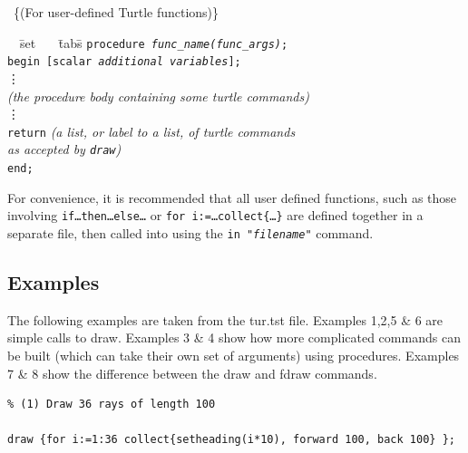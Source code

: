 \turtlesyntax\ \{\small {(For user-defined Turtle functions)}\} 
\begin{tabbing}
\ \ \= set \ \ \ \=tabs\=                                       \kill
 \> \texttt{procedure \textit{func\_name(func\_args)};}                  \\
 \> \texttt{begin [scalar \textit{additional variables}];}               \\   
 \> \> \vdots                                                      \\
 \> \> \textit{(the procedure body containing some turtle commands)}  \\
 \> \> \vdots                                                      \\ 
 \> \> \texttt{return} \textit{(a list, or label to a list, of turtle commands}\\
 \> \>            \>\textit{as accepted by \texttt{draw})}\\
 \> \texttt{end;} \\
\end{tabbing}

  For convenience, it is recommended that all user defined functions, such
as those involving \texttt{if\ldots then\ldots else\ldots} or \texttt{for
i:=\ldots collect\{\ldots\}} are defined together in a separate file, then
called into {\REDUCE} using the \texttt{in "\textit{filename}"} command.

\newpage

\subsection{Examples}

The following examples are taken from the tur.tst file. 
Examples 1,2,5 \& 6 are simple calls to draw. Examples 3 \& 4 show how 
more complicated commands can be built (which can take their own set of
arguments) using procedures. Examples 7 \& 8 show the difference between
the draw and fdraw commands.

\begin{verbatim}
% (1) Draw 36 rays of length 100

draw {for i:=1:36 collect{setheading(i*10), forward 100, back 100} };
\end{verbatim}

